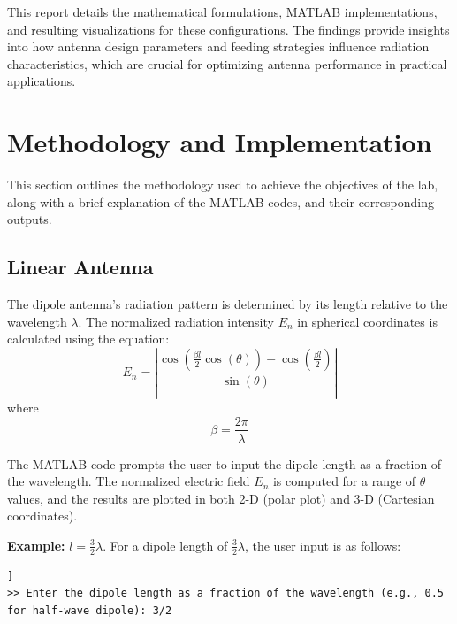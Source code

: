 \documentclass[a4paper, 12pt, english]{article}
\begin{document}
\noindent
This report details the mathematical formulations, MATLAB implementations, and resulting visualizations for these configurations. The findings provide insights into how antenna design parameters and feeding strategies influence radiation characteristics, which are crucial for optimizing antenna performance in practical applications.

\newpage
\section{Methodology and Implementation}

This section outlines the methodology used to achieve the objectives of the lab, along with a brief explanation of the MATLAB codes, and their corresponding outputs.

\subsection{Linear Antenna} \label{sec:linear antenna}



\noindent
The dipole antenna's radiation pattern is determined by its length relative to the wavelength $ \lambda $. The normalized radiation intensity $ {{E}_{n}} $ in spherical coordinates is calculated using the equation:
\[ {{E}_{n}} = \left| \frac{{\cos{\left( {\frac{{\beta}{l}}{2}}{\cos{\left( \theta \right)}} \right)}} - \cos{\left( {\frac{{\beta}{l}}{2}} \right)}}{\sin{\left( \theta \right)}} \right| \]
where
\[ {\beta} = {\frac{{2}{\pi}}{\lambda}} \]

The MATLAB code prompts the user to input the dipole length as a fraction of the wavelength. The normalized electric field $ {{E}_{n}} $ is computed for a range of $ {\theta} $ values, and the results are plotted in both 2-D (polar plot) and 3-D (Cartesian coordinates). {\\}

\noindent
\textbf{Example:} $ {l} = {\frac{3}{2}}{\lambda} $.
\newline
For a dipole length of $ {\frac{3}{2}}{\lambda} $, the user input is as follows:
\begin{lstlisting}[style=commandstyle,caption=Command line output]]
>> Enter the dipole length as a fraction of the wavelength (e.g., 0.5 for half-wave dipole): 3/2
\end{lstlisting}
\end{document}
